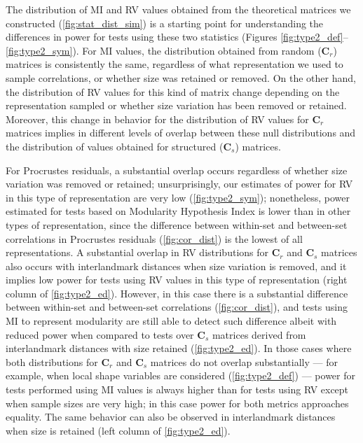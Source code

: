 \documentclass[12pt,twoside]{report}
\begin{document}
The distribution of MI and RV values obtained from the theoretical
matrices we constructed (\autoref{fig:stat_dist_sim}) is a starting
point for understanding the differences in power for tests using these
two statistics (Figures \ref{fig:type2_def}--\ref{fig:type2_sym}). For
MI values, the distribution obtained from random ($\mathbf{C}_r$)
matrices is consistently the same, regardless of what representation we
used to sample correlations, or whether size was retained or removed. On
the other hand, the distribution of RV values for this kind of matrix
change depending on the representation sampled or whether size variation
has been removed or retained. Moreover, this change in behavior for the
distribution of RV values for $\mathbf{C}_r$ matrices implies in
different levels of overlap between these null distributions and the
distribution of values obtained for structured ($\mathbf{C}_s$)
matrices.

For Procrustes residuals, a substantial overlap occurs regardless of
whether size variation was removed or retained; unsurprisingly, our
estimates of power for RV in this type of representation are very low
(\autoref{fig:type2_sym}); nonetheless, power estimated for tests based
on Modularity Hypothesis Index is lower than in other types of
representation, since the difference between within-set and between-set
correlations in Procrustes residuals (\autoref{fig:cor_dist}) is the
lowest of all representations. A substantial overlap in RV distributions
for $\mathbf{C}_r$ and $\mathbf{C}_s$ matrices also occurs with
interlandmark distances when size variation is removed, and it implies
low power for tests using RV values in this type of representation
(right column of \autoref{fig:type2_ed}). However, in this case there is
a substantial difference between within-set and between-set correlations
(\autoref{fig:cor_dist}), and tests using MI to represent modularity are
still able to detect such difference albeit with reduced power when
compared to tests over $\mathbf{C}_s$ matrices derived from
interlandmark distances with size retained (\autoref{fig:type2_ed}). In
those cases where both distributions for $\mathbf{C}_r$ and
$\mathbf{C}_s$ matrices do not overlap substantially --- for example,
when local shape variables are considered (\autoref{fig:type2_def}) ---
power for tests performed using MI values is always higher than for
tests using RV except when sample sizes are very high; in this case
power for both metrics approaches equality. The same behavior can also
be observed in interlandmark distances when size is retained (left
column of \autoref{fig:type2_ed}).
\end{document}
